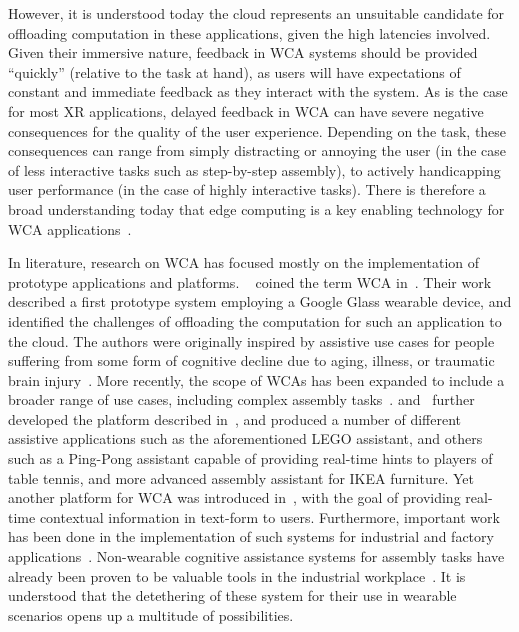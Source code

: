 However, it is understood today the cloud represents an unsuitable candidate for offloading computation in these applications, given the high latencies involved.
Given their immersive nature, feedback in \gls{WCA} systems should be provided ``quickly'' (relative to the task at hand), as users will have expectations of constant and immediate feedback as they interact with the system.
As is the case for most \gls{XR} applications, delayed feedback in \gls{WCA} can have severe negative consequences for the quality of the user experience.
Depending on the task, these consequences can range from simply distracting or annoying the user (in the case of less interactive tasks such as step-by-step assembly), to actively handicapping user performance (in the case of highly interactive tasks).
There is therefore a broad understanding today that edge computing is a key enabling technology for \gls{WCA} applications~\cite{ha2014towards,wang2020scaling,chen2018application,olguinmunoz2021impact}.

\medskip
In literature, research on \gls{WCA} has focused mostly on the implementation of prototype applications and platforms.
\citeauthor{ha2014towards}~\cite{ha2014towards} coined the term \acl{WCA} in\ \citeyear{ha2014towards}.
Their work described a first prototype system employing a Google Glass wearable device, and identified the challenges of offloading the computation for such an application to the cloud.
The authors were originally inspired by assistive use cases for people suffering from some form of cognitive decline due to aging, illness, or traumatic brain injury~\cite{ha2014towards,satyanarayanan2019augmenting}.
More recently, the scope of \glspl{WCA} has been expanded to include a broader range of use cases, including complex assembly tasks~\cite{chen2017empirical,chen2018application,wang2020scaling,wang2019towards}.
\cite{chen2015early} and~\cite{chen2018application} further developed the platform described in~\cite{ha2014towards}, and produced a number of different assistive applications such as the aforementioned LEGO assistant, and others such as a Ping-Pong assistant capable of providing real-time hints to players of table tennis, and more advanced assembly assistant for IKEA furniture.
Yet another platform for \gls{WCA} was introduced in~\cite{chatzopoulos2017hyperion}, with the goal of providing real-time contextual information in text-form to users.
Furthermore, important work has been done in the implementation of such systems for industrial and factory applications~\cite{belletier2021wearable}.
Non-wearable cognitive assistance systems for assembly tasks have already been proven to be valuable tools in the industrial workplace~\cite{funk2015cognitive,gorecky2011cognito}.
It is understood that the detethering of these system for their use in wearable scenarios opens up a multitude of possibilities.


